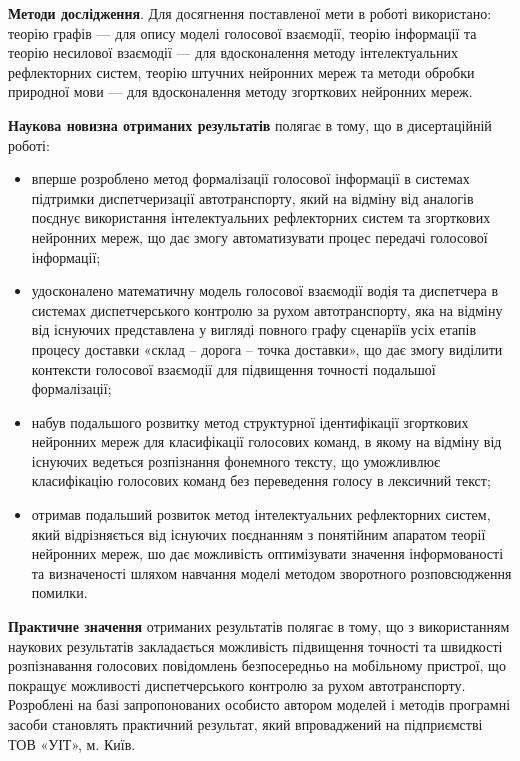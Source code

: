 \textbf{Методи дослідження}. Для досягнення поставленої мети в роботі використано: теорію графів --- для опису моделі голосової взаємодії, теорію інформації та теорію несилової взаємодії --- для вдосконалення методу інтелектуальних рефлекторних систем, теорію штучних нейронних мереж та методи обробки природної мови --- для вдосконалення методу згорткових нейронних мереж.

\textbf{Наукова новизна отриманих результатів} полягає в тому, що в дисертаційній роботі:

\begin{itemize}
	\item вперше розроблено метод формалізації голосової інформації в системах підтримки диспетчеризації автотранспорту, який на відміну від аналогів поєднує використання інтелектуальних рефлекторних систем та згорткових нейронних мереж, що дає змогу автоматизувати процес передачі голосової інформації;
	\item удосконалено математичну модель голосової взаємодії водія та диспетчера в системах диспетчерського контролю за рухом автотранспорту, яка на відміну від існуючих представлена у вигляді повного графу сценаріїв усіх етапів процесу доставки «склад – дорога – точка доставки», що дає змогу виділити контексти голосової взаємодії для підвищення точності подальшої формалізації;
	\item набув подальшого розвитку метод структурної ідентифікації згорткових нейронних мереж для класифікації голосових команд, в якому на відміну від існуючих ведеться розпізнання фонемного тексту, що уможливлює класифікацію голосових команд без переведення голосу в лексичний текст;
	\item отримав подальший розвиток метод інтелектуальних рефлекторних систем, який відрізняється від існуючих поєднанням з понятійним апаратом теорії нейронних мереж, шо дає можливість оптимізувати значення інформованості та визначеності шляхом навчання моделі методом зворотного розповсюдження помилки.
\end{itemize}

\textbf{Практичне значення} отриманих результатів полягає в тому, що з використанням наукових результатів закладається можливість підвищення точності та швидкості розпізнавання голосових повідомлень безпосередньо на мобільному пристрої, що покращує можливості диспетчерського контролю за рухом автотранспорту. Розроблені на базі запропонованих особисто автором моделей і методів програмні засоби становлять практичний результат, який впроваджений на підприємстві ТОВ «УІТ», м. Київ.

